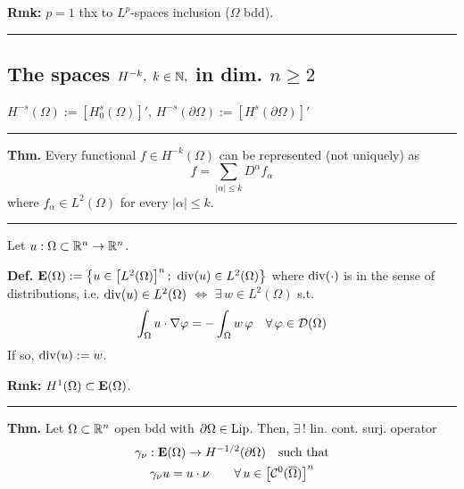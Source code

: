 \smallskip

\textbf{Rmk:} $p=1$ thx to $L^p$-spaces inclusion ($\Omega$ bdd).

\rule{0.31\textwidth}{0.2pt}


\subsection{\color{red}The spaces \texorpdfstring{$H^{-k},\ k\in\mathbb{N},$}{C} in dim. \texorpdfstring{$n\geq 2$}{C}}


$H^{-s}(\Omega):=\left[ H^s_0(\Omega) \right]'$, $H^{-s}(\partial\Omega):=\left[ H^s(\partial\Omega) \right]'$

\rule{0.31\textwidth}{0.2pt}
\smallskip

\textbf{Thm.} Every functional $f\in H^{-k}(\Omega)$ can be represented (not uniquely) as
\begin{equation*}
f=\sum_{|\alpha|\leq k} D^\alpha f_\alpha
\end{equation*}
where $f_\alpha\in L^2(\Omega)$ for every $|\alpha|\leq k$.

\rule{0.31\textwidth}{0.2pt}
\smallskip

Let $u:\Omega\subset\mathbb{R}^n\to\mathbb{R}^n$.

\smallskip

\textbf{Def.} $\mathbf{E}(\Omega):=\left\{ u\in \left[ L^2(\Omega) \right]^n;\ \operatorname{div}(u) \in L^2(\Omega) \right\}$ where $\operatorname{div}(\cdot)$ is in the sense of distributions, i.e. $\operatorname{div}(u)\in L^2(\Omega)$ $\Longleftrightarrow$ $\exists\, w\in L^2(\Omega)$ s.t.
\begin{equation*}
\int_\Omega u\cdot \nabla\varphi=-\int_\Omega w\,\varphi\quad\forall\,\varphi\in\mathcal{D}(\Omega)
\end{equation*}
If so, $\operatorname{div}(u):=w$.

\smallskip

\textbf{Rmk:} $H^1(\Omega)\subset\mathbf{E}(\Omega)$.

\rule{0.31\textwidth}{0.2pt}
\smallskip

\textbf{Thm.} Let $\Omega\subset\mathbb{R}^n$ open bdd with $\partial\Omega\in\operatorname{Lip}$. Then, $\exists\,!$ lin. cont. surj. operator 
\begin{gather*}
\gamma_\nu:\mathbf{E}(\Omega)\to H^{-1/2}(\partial\Omega)\quad\text{such that} \\
\gamma_\nu u=u\cdot\nu\qquad\forall\, u\in\left[\mathcal{C}^0(\overline{\Omega})\right]^n
\end{gather*}

